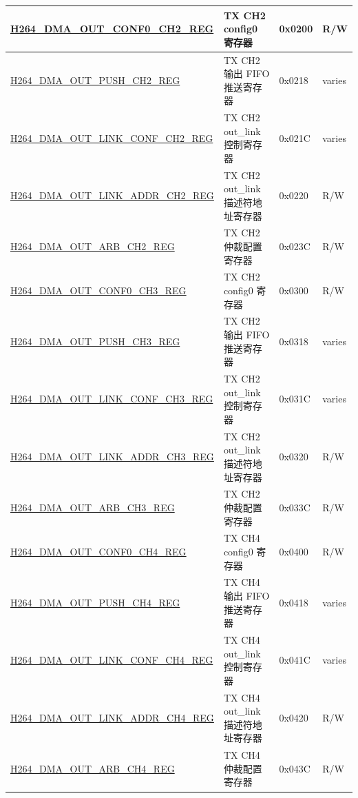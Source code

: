\begin{longtable}{ | p{7.5cm} | p{5.7cm} | p{1.2cm} | p{1.5cm} | }
    \hyperref[regdesc:H264DMAOUTCONF0CH2REG]{H264\_DMA\_OUT\_CONF0\_CH2\_REG} & TX CH2 config0 寄存器 & 0x0200 & R/W \\ \hline
    \hyperref[regdesc:H264DMAOUTPUSHCH2REG]{H264\_DMA\_OUT\_PUSH\_CH2\_REG} & TX CH2 输出 FIFO 推送寄存器 & 0x0218 & varies \\ \hline
    \hyperref[regdesc:H264DMAOUTLINKCONFCH2REG]{H264\_DMA\_OUT\_LINK\_CONF\_CH2\_REG} & TX CH2 out\_link 控制寄存器 & 0x021C & varies \\ \hline
    \hyperref[regdesc:H264DMAOUTLINKADDRCH2REG]{H264\_DMA\_OUT\_LINK\_ADDR\_CH2\_REG} & TX CH2 out\_link 描述符地址寄存器 & 0x0220 & R/W \\ \hline
    \hyperref[regdesc:H264DMAOUTARBCH2REG]{H264\_DMA\_OUT\_ARB\_CH2\_REG} & TX CH2 仲裁配置寄存器 & 0x023C & R/W \\ \hline

    \hyperref[regdesc:H264DMAOUTCONF0CH3REG]{H264\_DMA\_OUT\_CONF0\_CH3\_REG} & TX CH2 config0 寄存器 & 0x0300 & R/W \\ \hline
    \hyperref[regdesc:H264DMAOUTPUSHCH3REG]{H264\_DMA\_OUT\_PUSH\_CH3\_REG} & TX CH2 输出 FIFO 推送寄存器 & 0x0318 & varies \\ \hline
    \hyperref[regdesc:H264DMAOUTLINKCONFCH3REG]{H264\_DMA\_OUT\_LINK\_CONF\_CH3\_REG} & TX CH2 out\_link 控制寄存器 & 0x031C & varies \\ \hline
    \hyperref[regdesc:H264DMAOUTLINKADDRCH3REG]{H264\_DMA\_OUT\_LINK\_ADDR\_CH3\_REG} & TX CH2 out\_link 描述符地址寄存器 & 0x0320 & R/W \\ \hline
    \hyperref[regdesc:H264DMAOUTARBCH3REG]{H264\_DMA\_OUT\_ARB\_CH3\_REG} & TX CH2 仲裁配置寄存器 & 0x033C & R/W \\ \hline

    \hyperref[regdesc:H264DMAOUTCONF0CH4REG]{H264\_DMA\_OUT\_CONF0\_CH4\_REG} & TX CH4 config0 寄存器 & 0x0400 & R/W \\ \hline
    \hyperref[regdesc:H264DMAOUTPUSHCH4REG]{H264\_DMA\_OUT\_PUSH\_CH4\_REG} & TX CH4 输出 FIFO 推送寄存器 & 0x0418 & varies \\ \hline
    \hyperref[regdesc:H264DMAOUTLINKCONFCH4REG]{H264\_DMA\_OUT\_LINK\_CONF\_CH4\_REG} & TX CH4 out\_link 控制寄存器 & 0x041C & varies \\ \hline
    \hyperref[regdesc:H264DMAOUTLINKADDRCH4REG]{H264\_DMA\_OUT\_LINK\_ADDR\_CH4\_REG} & TX CH4 out\_link 描述符地址寄存器 & 0x0420 & R/W \\ \hline
    \hyperref[regdesc:H264DMAOUTARBCH4REG]{H264\_DMA\_OUT\_ARB\_CH4\_REG} & TX CH4 仲裁配置寄存器 & 0x043C & R/W \\ \hline


\end{longtable}
